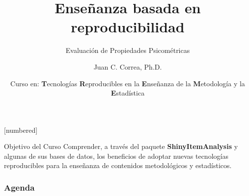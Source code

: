 \documentclass{beamer}
\begin{document}



\author[Juan C. Correa \textcolor{white}{(\url{https://correajc.com}})]{Juan C. Correa, Ph.D.}
\title[Enseñanza basada en reproducibilidad]{Enseñanza basada en reproducibilidad}
\subtitle{Evaluación de Propiedades Psicométricas}
[numbered]
\date[Bogotá, Junio-2021]{Curso en: \textbf{T}ecnologías \textbf{R}eproducibles en la \textbf{E}nseñanza de la \textbf{M}etodología y la \textbf{E}stadística}


\begin{frame}
	\titlepage
\end{frame}

\begin{frame}
\begin{block}{Objetivo del Curso}
\vspace{0.3cm}
Comprender, a través del paquete \textbf{ShinyItemAnalysis} y algunas de sus bases de datos, los beneficios de adoptar nuevas tecnologías reproducibles para la enseñanza de contenidos metodológicos y estadísticos.
\end{block}
\end{frame}



\begin{frame}
\frametitle{Agenda} 
\tableofcontents
\end{frame}
\end{document}
